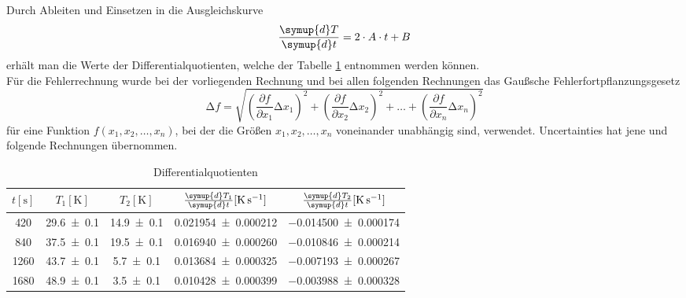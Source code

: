Durch Ableiten und Einsetzen in die Ausgleichskurve
\begin{equation}
  \frac{\symup{d}T}{\symup{d}t}= 2 \cdot A \cdot t + B
\end{equation}
erhält man die Werte der Differentialquotienten, welche der Tabelle \ref{tab:tabelle1} entnommen werden können.
\\
Für die Fehlerrechnung wurde bei der vorliegenden Rechnung und bei allen folgenden Rechnungen das Gaußsche Fehlerfortpflanzungsgesetz
\begin{equation}
\increment{f} = \sqrt{(\frac{\partial f}{\partial x_1}\increment{x_1})^2 + (\frac{\partial f}{\partial x_2}\increment{x_2})^2 + \dotsc + (\frac{\partial f}{\partial x_n}\increment{x_n})^2}
\end{equation}
für eine Funktion $f(x_1,x_2, \dotsc ,x_n)$, bei der die Größen $x_1, x_2, \dotsc , x_n$ voneinander unabhängig sind, verwendet.
Uncertainties \cite{uncertainties} hat jene und folgende Rechnungen übernommen.
\begin{table}
  \centering
  \caption{Differentialquotienten}
  \label{tab:tabelle1}
  \begin{tabular}{c c c c c}
    \toprule
    {$t [\si{\second}]$} & {$T_1 [\si{\kelvin}]$} & {$T_2 [\si{\kelvin}]$} & {$\frac{\symup{d}T_1}{\symup{d}t} [\si{\kelvin\per\second}]$}  & {$\frac{\symup{d}T_2}{\symup{d}t} [\si{\kelvin\per\second}]$}\\
    \midrule
    \num{420} & \num{29.6 +- 0.1} & \num{14.9 +- 0.1} & \num{0.021954 +- 0.000212} & \num{-0.014500 +- 0.000174} \\
    \num{840} & \num{37.5 +- 0.1} & \num{19.5 +- 0.1} & \num{0.016940 +- 0.000260} & \num{-0.010846 +- 0.000214} \\
    \num{1260} & \num{43.7 +- 0.1} & \num{5.7 +- 0.1} & \num{0.013684 +- 0.000325} & \num{-0.007193 +- 0.000267} \\
    \num{1680} & \num{48.9 +- 0.1} & \num{3.5 +- 0.1} & \num{0.010428 +- 0.000399} & \num{-0.003988 +- 0.000328} \\
    \bottomrule
  \end{tabular}
\end{table}
